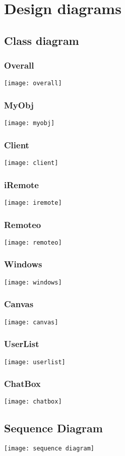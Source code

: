 \documentclass{article}
\begin{document}
\section*{Design diagrams}
\subsection*{Class diagram}
\subsubsection*{Overall}
\texttt{[image: overall]}
\subsubsection*{MyObj}
\texttt{[image: myobj]}
\subsubsection*{Client}
\texttt{[image: client]}
\subsubsection*{iRemote}
\texttt{[image: iremote]}
\subsubsection*{Remoteo}
\texttt{[image: remoteo]}
\subsubsection*{Windows}
\texttt{[image: windows]}
\subsubsection*{Canvas}
\texttt{[image: canvas]}
\subsubsection*{UserList}
\texttt{[image: userlist]}
\subsubsection*{ChatBox}
\texttt{[image: chatbox]}

\subsection*{Sequence Diagram}
\texttt{[image: sequence diagram]}
\end{document}
